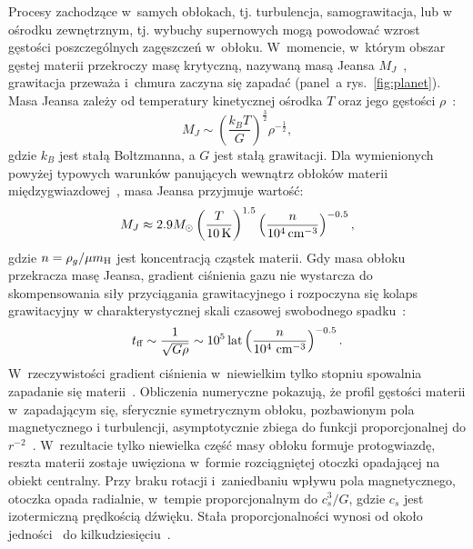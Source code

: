 \par Procesy zachodzące w~samych obłokach, tj. turbulencja, samograwitacja, lub
w ośrodku zewnętrznym, tj. wybuchy supernowych mogą powodować wzrost gęstości
poszczególnych zagęszczeń w~obłoku. W~momencie, w~którym obszar gęstej materii
przekroczy  masę krytyczną, nazywaną masą Jeansa $M_J$~\cite{J1902, J1928},
grawitacja przeważa i~chmura zaczyna się zapadać (panel~a
rys.~\ref{fig:planet}). Masa Jeansa zależy od temperatury kinetycznej ośrodka
$T$ oraz jego gęstości $\rho$~\cite{H64}:
%
\begin{equation} M_J \sim
   \left( \frac{k_B T}{G} \right) ^\frac{3}{2} {\rho}^{-\frac{1}{2}},
\end{equation}
%
gdzie $k_B$ jest stałą Boltzmanna, a $G$ jest stałą grawitacji.
Dla wymienionych powyżej typowych warunków panujących wewnątrz obłoków materii
międzygwiazdowej~\cite{BM89}, masa Jeansa przyjmuje wartość:
%
\begin{equation}
 M_J \approx 2.9 M_{\odot} \left(\frac{T}{10\hbox{$\thinspace\textrm{K}$}}\right)^{1.5} 
 \left(\frac{n}{10^4\hbox{$\thinspace\textrm{cm}$}^{-3}}\right)^{-0.5},
\end{equation}
%
gdzie $n = \rho_g / \mu \hbox{$m_{\textrm{H}}$}$ jest koncentracją cząstek materii.  Gdy masa obłoku
przekracza masę Jeansa, gradient ciśnienia gazu nie wystarcza do skompensowania
siły przyciągania grawitacyjnego i rozpoczyna się kolaps grawitacyjny w
charakterystycznej skali czasowej swobodnego spadku~\cite{Spitzer1978}:
%
\begin{equation}
   t_{\textrm{ff}} \sim \frac{1}{\sqrt{G\rho}} \sim 10^5\hbox{$\thinspace\textrm{lat}$}
   \left(\frac{n}{10^4\thinspace \hbox{$\thinspace\textrm{cm}$}^{-3}}\right)^{-0.5}.
\end{equation}
%
W~rzeczywistości gradient ciśnienia w~niewielkim tylko stopniu spowalnia
zapadanie się materii~\cite{T82}. Obliczenia numeryczne pokazują, że profil
gęstości materii w~zapadającym się, sferycznie symetrycznym obłoku, pozbawionym
pola magnetycznego i turbulencji, asymptotycznie zbiega do funkcji
proporcjonalnej do $r^{-2}$~\cite{L69}. W~rezultacie tylko niewielka część masy
obłoku formuje protogwiazdę, reszta materii zostaje uwięziona w~formie
rozciągniętej otoczki opadającej na obiekt centralny. Przy braku rotacji
i~zaniedbaniu wpływu pola magnetycznego, otoczka opada radialnie, w~tempie
proporcjonalnym do $c_s^3 / G$, gdzie $c_s$ jest izotermiczną prędkością
dźwięku.  Stała proporcjonalności wynosi od około jedności~\cite{S77} do
kilkudziesięciu~\cite{H77}.

